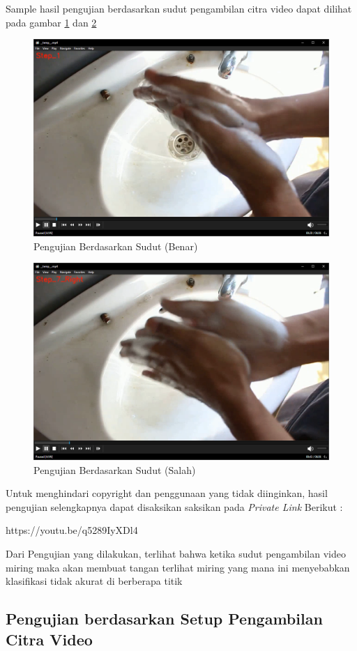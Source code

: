 Sample hasil pengujian berdasarkan sudut pengambilan citra video dapat dilihat pada gambar \ref{fig:sudutbenar1} dan \ref{fig:sudutsalah1}

\begin{figure}[!ht]
	\centering
	\includegraphics[width=0.6\columnwidth]{gambar/sudutbenar1.png}
	\caption{Pengujian Berdasarkan Sudut (Benar)}
	\label{fig:sudutbenar1}
\end{figure}
\begin{figure}[!ht]
	\centering
	\includegraphics[width=0.6\columnwidth]{gambar/sudutsalah1.png}
	\caption{Pengujian Berdasarkan Sudut (Salah)}
	\label{fig:sudutsalah1}
\end{figure}

Untuk menghindari copyright dan penggunaan yang tidak diinginkan, hasil pengujian selengkapnya dapat disaksikan saksikan pada \textit{Private Link} Berikut :
\begin{center}
	https://youtu.be/q5289IyXDl4
\end{center}

Dari Pengujian yang dilakukan, terlihat bahwa ketika sudut pengambilan video miring maka akan membuat tangan terlihat miring yang mana ini menyebabkan klasifikasi tidak akurat di berberapa titik

\subsection{Pengujian berdasarkan Setup Pengambilan Citra Video}
\label{subsec:ujisetup}

